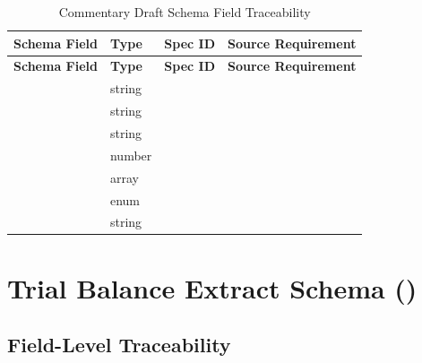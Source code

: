 \begin{longtable}{@{}L{4cm}L{2.5cm}C{2cm}L{4.5cm}@{}}
\caption{Commentary Draft Schema Field Traceability}
\label{tab:commentary-draft-fields} \\
\toprule
\textbf{Schema Field} & \textbf{Type} & \textbf{Spec ID} & \textbf{Source Requirement} \\
\midrule
\endfirsthead
\toprule
\textbf{Schema Field} & \textbf{Type} & \textbf{Spec ID} & \textbf{Source Requirement} \\
\midrule
\endhead
{} & string &  &  \\
 & string &  &  \\
 & string &  &  \\
 & number &  &  \\
 & array &  &  \\
 & enum &  &  \\
 & string &  &  \\
\bottomrule
\end{longtable}

\section{Trial Balance Extract Schema ()}
\label{sec:tb-extract-schema}

\subsection{Field-Level Traceability}

